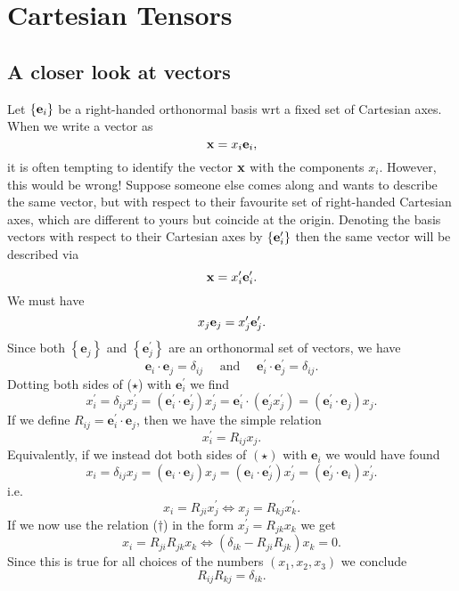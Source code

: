 \section{Cartesian Tensors}
\subsection{A closer look at vectors}
Let $ \{{\bf e}_i\} $ be a right-handed orthonormal basis wrt a fixed set of Cartesian axes. When we write a vector as
\[
    {\bf x} = x_i{\bf e}_i,
\]
it is often tempting to identify the vector $ {\bf x} $ with the components $ x_i $. However, this would be wrong! Suppose someone else comes along and wants to describe the same vector, but with respect to their favourite set of right-handed Cartesian axes, which are different to yours but coincide at the origin. Denoting the basis vectors with respect to their Cartesian
axes by $ \{{\bf e}_i'\} $ then the same vector will be described via
\[
    {\bf x} = x_i'{\bf e}_i'.
\]
We must have 
\[
    x_j{\bf e}_j=x_j'{\bf e}_j'.
\]
Since both $\left\{\mathbf{e}_{j}\right\}$ and $\left\{\mathbf{e}_{j}^{\prime}\right\}$ are an orthonormal set of vectors, we have
\begin{equation}
    \mathbf{e}_{i} \cdot \mathbf{e}_{j}=\delta_{i j} \quad \text { and } \quad \mathbf{e}_{i}^{\prime} \cdot \mathbf{e}_{j}^{\prime}=\delta_{i j}.\tag{$\star$}
\end{equation}
Dotting both sides of ($\star$) with $\mathbf{e}_{i}^{\prime}$ we find
\[
x_{i}^{\prime}=\delta_{i j} x_{j}^{\prime}=\left(\mathbf{e}_{i}^{\prime} \cdot \mathbf{e}_{j}^{\prime}\right) x_{j}^{\prime}=\mathbf{e}_{i}^{\prime} \cdot\left(\mathbf{e}_{j}^{\prime} x_{j}^{\prime}\right)=\left(\mathbf{e}_{i}^{\prime} \cdot \mathbf{e}_{j}\right) x_{j}.
\]
If we define $R_{i j}=\mathbf{e}_{i}^{\prime} \cdot \mathbf{e}_{j}$, then we have the simple relation
\begin{equation}
    x_{i}^{\prime}=R_{i j} x_{j}.\tag{$\dagger$}
\end{equation}
Equivalently, if we instead dot both sides of $(\star)$ with $\mathbf{e}_{i}$ we would have found
\[
x_{i}=\delta_{i j} x_{j}=\left(\mathbf{e}_{i} \cdot \mathbf{e}_{j}\right) x_{j}=\left(\mathbf{e}_{i} \cdot \mathbf{e}_{j}^{\prime}\right) x_{j}^{\prime}=\left(\mathbf{e}_{j}^{\prime} \cdot \mathbf{e}_{i}\right) x_{j}^{\prime}.
\]
i.e.
\[
x_{i}=R_{j i} x_{j}^{\prime} \Longleftrightarrow x_{j}=R_{k j} x_{k}^{\prime}.
\]
If we now use the relation ($\dagger$) in the form $x_{j}^{\prime}=R_{j k} x_{k}$ we get
\[
x_{i}=R_{j i} R_{j k} x_{k} \Longleftrightarrow \left(\delta_{i k}-R_{j i} R_{j k}\right) x_{k}=0.
\]
Since this is true for all choices of the numbers $\left(x_{1}, x_{2}, x_{3}\right)$ we conclude
\[
R_{i j} R_{k j}=\delta_{i k}.
\]

